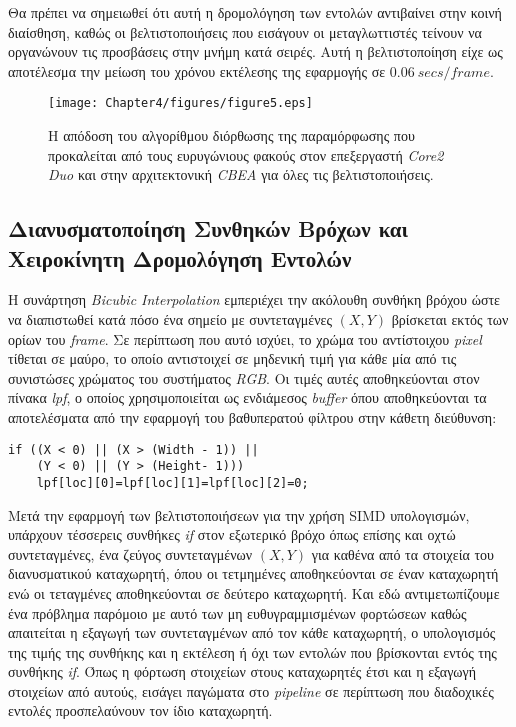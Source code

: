 Θα πρέπει να σημειωθεί ότι αυτή η δρομολόγηση των εντολών αντιβαίνει στην κοινή διαίσθηση, καθώς οι βελτιστοποιήσεις που εισάγουν οι μεταγλωττιστές τείνουν να οργανώνουν τις προσβάσεις στην μνήμη κατά σειρές. Αυτή η βελτιστοποίηση είχε ως αποτέλεσμα την μείωση του χρόνου εκτέλεσης της εφαρμογής σε \(0.06\ secs/frame\).
\begin{figure}[b]
\centering
\texttt{[image: Chapter4/figures/figure5.eps]}
\caption{Η απόδοση του αλγορίθμου διόρθωσης της παραμόρφωσης που προκαλείται από τους ευρυγώνιους φακούς στον επεξεργαστή \textsl{Core2 Duo} και στην αρχιτεκτονική \textsl{CBEA} για όλες τις βελτιστοποιήσεις.}
\label{figure:fig45}
\end{figure}

\subsection[4.2.4 Διανυσματοποίηση Συνθηκών Βρόχων και Χειροκίνητη Δρομολόγηση Εντολών]{Διανυσματοποίηση Συνθηκών Βρόχων και Χειροκίνητη Δρομολόγηση Εντολών}
\label{subsection:sub424}
\indent
Η συνάρτηση \textsl{Bicubic Interpolation} εμπεριέχει την ακόλουθη συνθήκη βρόχου ώστε να διαπιστωθεί κατά πόσο ένα σημείο με συντεταγμένες \((X,Y)\) βρίσκεται εκτός των ορίων του \textsl{frame}. Σε περίπτωση που αυτό ισχύει, το χρώμα του αντίστοιχου \textsl{pixel} τίθεται σε μαύρο, το οποίο αντιστοιχεί σε μηδενική τιμή για κάθε μία από τις συνιστώσες χρώματος του συστήματος \textsl{RGB}. Οι τιμές αυτές αποθηκεύονται στον πίνακα \textsl{lpf}, ο οποίος χρησιμοποιείται ως ενδιάμεσος \textsl{buffer} όπου αποθηκεύονται τα αποτελέσματα από την εφαρμογή του βαθυπερατού φίλτρου στην κάθετη διεύθυνση:\newline
\begin{lstlisting}
if ((X < 0) || (X > (Width - 1)) ||
    (Y < 0) || (Y > (Height- 1)))
    lpf[loc][0]=lpf[loc][1]=lpf[loc][2]=0;
\end{lstlisting}
\indent
Μετά την εφαρμογή των βελτιστοποιήσεων για την χρήση \ac{SIMD} υπολογισμών, υπάρχουν τέσσερεις συνθήκες \textsl{if} στον εξωτερικό βρόχο όπως επίσης και οχτώ συντεταγμένες, ένα ζεύγος συντεταγμένων \((X,Y)\) για καθένα από τα στοιχεία του διανυσματικού καταχωρητή, όπου οι τετμημένες αποθηκεύονται σε έναν καταχωρητή ενώ οι τεταγμένες αποθηκεύονται σε δεύτερο καταχωρητή. Και εδώ αντιμετωπίζουμε ένα πρόβλημα παρόμοιο με αυτό των μη ευθυγραμμισμένων φορτώσεων καθώς απαιτείται η εξαγωγή των συντεταγμένων από τον κάθε καταχωρητή, ο υπολογισμός της τιμής της συνθήκης και η εκτέλεση ή όχι των εντολών που βρίσκονται εντός της συνθήκης \textsl{if}. Όπως η φόρτωση στοιχείων στους καταχωρητές έτσι και η εξαγωγή στοιχείων από αυτούς, εισάγει παγώματα στο \textsl{pipeline} σε περίπτωση που διαδοχικές εντολές προσπελαύνουν τον ίδιο καταχωρητή.\newline \indent
